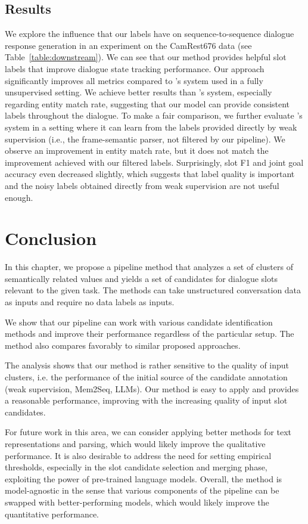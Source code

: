 \subsection{Results} We explore the influence that our labels have on sequence-to-sequence dialogue response generation in an experiment on the CamRest676 data (see Table~\ref{table:downstream}).
We can see that our method provides helpful slot labels that improve dialogue state tracking performance.
Our approach significantly improves all metrics compared to \citet{jin2018explicit}'s system used in a fully unsupervised setting.
We achieve better results than \citet{jin2018explicit}'s system, especially regarding entity match rate, suggesting that our model can provide consistent labels throughout the dialogue.
To make a fair comparison, we further evaluate \citet{jin2018explicit}'s system in a setting where it can learn from the labels provided directly by weak supervision (i.e., the frame-semantic parser, not filtered by our pipeline).
We observe an improvement in entity match rate, but it does not match the improvement achieved with our filtered labels. Surprisingly, slot F1 and joint goal accuracy even decreased slightly, 
which suggests that label quality is important and the noisy labels obtained directly from weak supervision are not useful enough.

\section{Conclusion}
In this chapter, we propose a pipeline method that analyzes a set of clusters of semantically related values and yields a set of candidates for dialogue slots relevant to the given task.
The methods can take unstructured conversation data as inputs and require no data labels as inputs.

We show that our pipeline can work with various candidate identification methods and improve their performance regardless of the particular setup.
The method also compares favorably to similar proposed approaches.

The analysis shows that our method is rather sensitive to the quality of input clusters, i.e. the performance of the initial source of the candidate annotation (weak supervision, Mem2Seq, LLMs).
Our method is easy to apply and provides a reasonable performance, improving with the increasing quality of input slot candidates.

For future work in this area, we can consider applying better methods for text representations and parsing, which would likely improve the qualitative performance.
It is also desirable to address the need for setting empirical thresholds, especially in the slot candidate selection and merging phase, exploiting the power of pre-trained language models.
Overall, the method is model-agnostic in the sense that various components of the pipeline can be swapped with better-performing models, which would likely improve the quantitative performance.